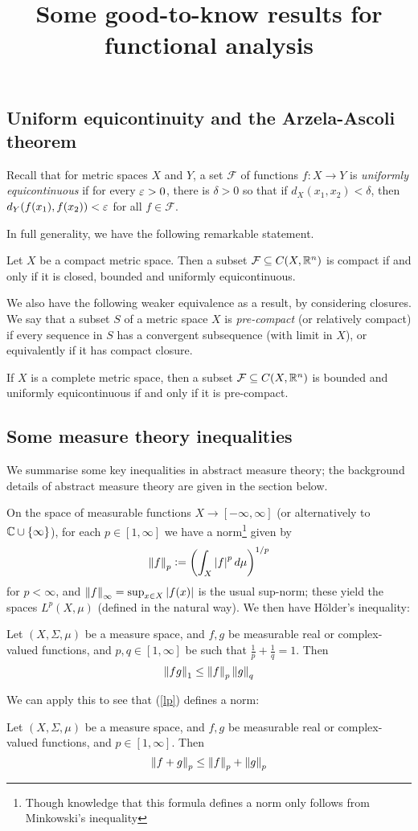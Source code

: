 \documentclass[11pt]{article}
\title{Some good-to-know results for functional analysis}
\renewcommand{\F}{\mathcal{F}}
\begin{document}
\maketitle
\subsection*{Uniform equicontinuity and the Arzela-Ascoli theorem}
Recall that for metric spaces $X$ and $Y$, a set $\F$ of functions $f : X \to Y$ is \emph{uniformly equicontinuous} if for every $\varepsilon > 0$, there is $\delta > 0$ so that if $d_X(x_1, x_2) < \delta$, then $d_Y(f(x_1), f(x_2)) < \varepsilon$ for all $f \in \F$.

In full generality, we have the following remarkable statement.
\begin{theorem}
    Let $X$ be a compact metric space. Then a subset $\F \subseteq C(X, \R^n)$ is compact if and only if it is closed, bounded and uniformly equicontinuous.
\end{theorem}
We also have the following weaker equivalence as a result, by considering closures. We say that a subset $S$ of a metric space $X$ is \emph{pre-compact} (or relatively compact) if every sequence in $S$ has a convergent subsequence (with limit in $X$), or equivalently if it has compact closure.
\begin{corollary}
    If $X$ is a complete metric space, then a subset $\F \subseteq C(X, \R^n)$  is bounded and uniformly equicontinuous if and only if it is pre-compact.
\end{corollary}
\subsection*{Some measure theory inequalities}
We summarise some key inequalities in abstract measure theory; the background details of abstract measure theory are given in the section below.

On the space of measurable functions $X \to [-\infty, \infty]$ (or alternatively to $\mathbb{C} \cup \left\{  \infty  \right\}$), for each $p \in [1, \infty]$ we have a norm\footnote{Though knowledge that this formula defines a norm only follows from Minkowski's inequality} given by
\begin{align}\label{lp}
    \left\| f \right\|_p \vcentcolon= \left(  \int_X\left| f \right|^pd\mu  \right)^{1/p}
\end{align}
for $p < \infty$, and $\left\| f \right\|_\infty = \sup_{x \in X}\left| f(x) \right|$ is the usual sup-norm; these yield the spaces $L^p(X, \mu)$ (defined in the natural way). We then have H\"older's inequality:
\begin{theorem}
    Let $(X, \Sigma, \mu)$ be a measure space, and $f, g$ be measurable real or complex-valued functions, and $p, q \in [1, \infty]$ be such that $\frac1p + \frac1q = 1$. Then
    $$
        \left\| fg \right\|_1 \leq \left\| f \right\|_p\left\| g \right\|_q
    $$
\end{theorem}
We can apply this to see that (\ref{lp}) defines a norm:
\begin{theorem}
    Let $(X, \Sigma, \mu)$ be a measure space, and $f, g$ be measurable real or complex-valued functions, and $p \in [1, \infty]$. Then
    $$
        \left\| f + g \right\|_p \leq \left\| f \right\|_p + \left\| g \right\|_p
    $$
\end{theorem}
\end{document}

